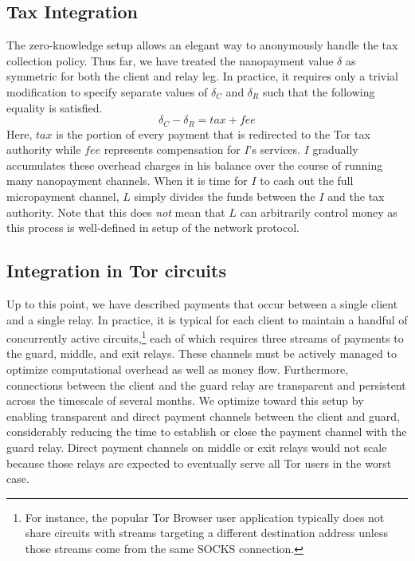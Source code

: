 \subsection{Tax Integration}

The zero-knowledge setup allows an elegant way to anonymously handle the tax
collection policy. Thus far, we have treated the nanopayment value $\delta$ as
symmetric for both the client and relay leg. In practice, it requires only a
trivial modification to specify separate values of $\delta_C$ and $\delta_R$
such that the following equality is satisfied.
\begin{equation}
  \delta_C - \delta_R = tax + fee
  \label{eq:payment}
\end{equation}
Here, $tax$ is the portion of every payment that is redirected to the Tor tax
authority while $fee$ represents compensation for $I$'s services. $I$ gradually
accumulates these overhead charges in his balance over the course of running
many nanopayment channels. When it is time for $I$ to cash out the full
micropayment channel, $L$ simply divides the funds between the $I$ and the tax
authority. Note that this does \emph{not} mean that $L$ can arbitrarily control
money as this process is well-defined in setup of the network protocol.

\subsection{Integration in Tor circuits}
Up to this point, we have described payments that occur between a single client
and a single relay. In practice, it is typical for each client to maintain a
handful of concurrently active circuits,\footnote{For instance, the popular Tor
  Browser user application typically does not share circuits with streams
  targeting a different destination address unless those streams come from the
  same SOCKS connection.} each of which requires three streams of payments to
the guard, middle, and exit relays. These channels must be actively managed to
optimize computational overhead as well as money flow. Furthermore, connections
between the client and the guard relay are transparent and persistent across the
timescale of several months. We optimize toward this setup by enabling
transparent and direct payment channels between the client and guard,
considerably reducing the time to establish or close the payment channel with
the guard relay. Direct payment channels on middle or exit relays would not
scale because those relays are expected to eventually serve all Tor users in the
worst case.


